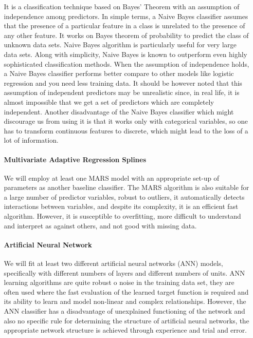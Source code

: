 \documentclass[
  10pt,
]{article}
\begin{document}
It is a classification technique based on Bayes' Theorem with an assumption of independence among predictors. In simple terms, a Naive Bayes classifier assumes that the presence of a particular feature in a class is unrelated to the presence of any other feature. It works on Bayes theorem of probability to predict the class of unknown data sets. Naive Bayes algorithm is particularly useful for very large data sets. Along with simplicity, Naive Bayes is known to outperform even highly sophisticated classification methods. When the assumption of independence holds, a Naive Bayes classifier performs better compare to other models like logistic regression and you need less training data. It should be however noted that this assumption of independent predictors may be unrealistic since, in real life, it is almost impossible that we get a set of predictors which are completely independent. Another disadvantage of the Naive Bayes classifier which might discourage us from using it is that it works only with categorical variables, so one has to transform continuous features to discrete, which might lead to the loss of a lot of information.

\hypertarget{multivariate-adaptive-regression-splines}{%
\paragraph{Multivariate Adaptive Regression Splines}\label{multivariate-adaptive-regression-splines}}

We will employ at least one MARS model with an appropriate set-up of parameters as another baseline classifier. The MARS algorithm is also suitable for a large number of predictor variables, robust to outliers, it automatically detects interactions between variables, and despite its complexity, it is an efficient fast algorithm. However, it is susceptible to overfitting, more difficult to understand and interpret as against others, and not good with missing data.

\hypertarget{artificial-neural-network}{%
\paragraph{Artificial Neural Network}\label{artificial-neural-network}}

We will fit at least two different artificial neural networks (ANN) models, specifically with different numbers of layers and different numbers of units. ANN learning algorithms are quite robust o noise in the training data set, they are often used where the fast evaluation of the learned target function is required and its ability to learn and model non-linear and complex relationships. However, the ANN classifier has a disadvantage of unexplained functioning of the network and also no specific rule for determining the structure of artificial neural networks, the appropriate network structure is achieved through experience and trial and error.
\end{document}
